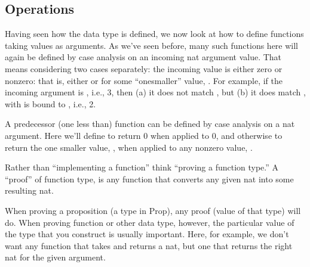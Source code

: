 \documentclass[letterpaper,10pt,english]{sphinxmanual}
\begin{document}
\subsection{Operations}
\label{\detokenize{A_03_Recursive_Types:operations}}
\sphinxAtStartPar
Having seen how the  data type is defined, we now look
at how to define functions taking  values as arguments.
As we’ve seen before, many such functions here will again be
defined by case analysis on an incoming nat argument value.
That means considering two cases separately: the incoming value
is either zero or non\sphinxhyphen{}zero: that is, either  or
 for some “one\sphinxhyphen{}smaller” value, . For example,
if the incoming argument is , i.e., 3,
then (a) it does not match , but (b) it does match
, with  is bound to , i.e., 2.

\begin{sphinxVerbatim}[commandchars=\\\{\}]
        
    
\end{sphinxVerbatim}

\sphinxAtStartPar
A predecessor (one less than) function can be defined by
case analysis on a nat argument. Here we’ll define 
to return 0 when applied to 0, and otherwise to return the
one smaller value, , when applied to any non\sphinxhyphen{}zero value,
.

\sphinxAtStartPar
Rather than “implementing a function” think “proving a function
type.” A “proof” of function type,  is any function
that converts any given nat into some resulting nat.

\sphinxAtStartPar
When proving a proposition (a type in Prop), any proof (value
of that type) will do. When proving function or other data type,
however, the particular value of the type that you construct is
usually important. Here, for example, we don’t want any function
that takes and returns a nat, but one that returns the right nat
for the given argument.
\end{document}
